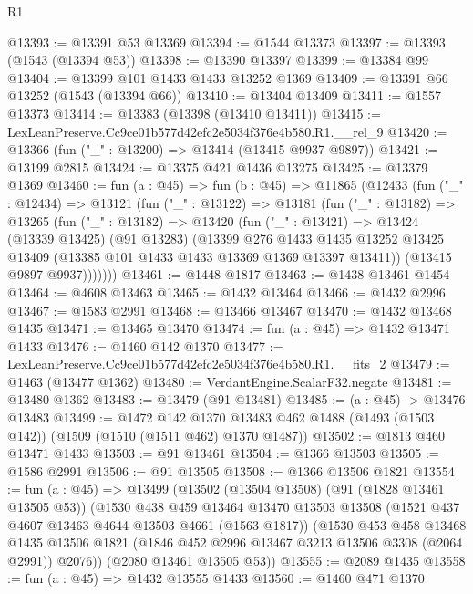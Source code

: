 \begin{lexlean}{R1}
\begin{coremodule}
@13393 := @13391 @53 @13369
@13394 := @1544 @13373
@13397 := @13393 (@1543 (@13394 @53))
@13398 := @13390 @13397
@13399 := @13384 @99
@13404 := @13399 @101 @1433 @1433 @13252 @1369
@13409 := @13391 @66 @13252 (@1543 (@13394 @66))
@13410 := @13404 @13409
@13411 := @1557 @13373
@13414 := @13383 (@13398 (@13410 @13411))
@13415 := LexLeanPreserve.Cc9ce01b577d42efc2e5034f376e4b580.R1.__rel_9
@13420 := @13366 (fun ("_" : @13200) => @13414 (@13415 @9937 @9897))
@13421 := @13199 @2815
@13424 := @13375 @421 @1436 @13275
@13425 := @13379 @1369
@13460 := fun (a : @45) =>
  fun (b : @45) =>
  @11865
    (@12433
      (fun ("_" : @12434) =>
      @13121
        (fun ("_" : @13122) =>
        @13181
          (fun ("_" : @13182) =>
          @13265
            (fun ("_" : @13182) =>
            @13420
              (fun ("_" : @13421) =>
              @13424
                (@13339 @13425)
                (@91 @13283)
                (@13399
                  @276
                  @1433
                  @1435
                  @13252
                  @13425
                  @13409
                  (@13385 @101 @1433 @1433 @13369 @1369 @13397 @13411))
                (@13415 @9897 @9937)))))))
@13461 := @1448 @1817
@13463 := @1438 @13461 @1454
@13464 := @4608 @13463
@13465 := @1432 @13464
@13466 := @1432 @2996
@13467 := @1583 @2991
@13468 := @13466 @13467
@13470 := @1432 @13468 @1435
@13471 := @13465 @13470
@13474 := fun (a : @45) => @1432 @13471 @1433
@13476 := @1460 @142 @1370
@13477 := LexLeanPreserve.Cc9ce01b577d42efc2e5034f376e4b580.R1.__fits_2
@13479 := @1463 (@13477 @1362)
@13480 := VerdantEngine.ScalarF32.negate
@13481 := @13480 @1362
@13483 := @13479 (@91 @13481)
@13485 := (a : @45) -> @13476 @13483
@13499 := @1472
    @142
    @1370
    @13483
    @462
    @1488
    (@1493 (@1503 @142))
    (@1509 (@1510 (@1511 @462) @1370 @1487))
@13502 := @1813 @460 @13471 @1433
@13503 := @91 @13461
@13504 := @1366 @13503
@13505 := @1586 @2991
@13506 := @91 @13505
@13508 := @1366 @13506 @1821
@13554 := fun (a : @45) =>
  @13499
    (@13502
      (@13504 @13508)
      (@91 (@1828 @13461 @13505 @53))
      (@1530
        @438
        @459
        @13464
        @13470
        @13503
        @13508
        (@1521 @437 @4607 @13463 @4644 @13503 @4661 (@1563 @1817))
        (@1530
          @453
          @458
          @13468
          @1435
          @13506
          @1821
          (@1846 @452 @2996 @13467 @3213 @13506 @3308 (@2064 @2991))
          @2076))
      (@2080 @13461 @13505 @53))
@13555 := @2089 @1435
@13558 := fun (a : @45) => @1432 @13555 @1433
@13560 := @1460 @471 @1370

\end{coremodule}
\end{lexlean}
